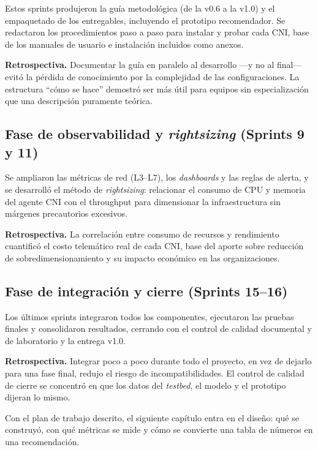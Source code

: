 Estos sprints produjeron la guía metodológica (de la v0.6 a la v1.0) y el empaquetado de los entregables, incluyendo el prototipo recomendador. Se redactaron los procedimientos paso a paso para instalar y probar cada CNI, base de los manuales de usuario e instalación incluidos como anexos.

\textbf{Retrospectiva.} Documentar la guía en paralelo al desarrollo ---y no al final--- evitó la pérdida de conocimiento por la complejidad de las configuraciones. La estructura ``cómo se hace'' demostró ser más útil para equipos sin especialización que una descripción puramente teórica.

\subsection{Fase de observabilidad y \emph{rightsizing} (Sprints 9 y 11)}

Se ampliaron las métricas de red (L3--L7), los \emph{dashboards} y las reglas de alerta, y se desarrolló el método de \emph{rightsizing}: relacionar el consumo de CPU y memoria del agente CNI con el throughput para dimensionar la infraestructura sin márgenes precautorios excesivos.

\textbf{Retrospectiva.} La correlación entre consumo de recursos y rendimiento cuantificó el costo telemático real de cada CNI, base del aporte sobre reducción de sobredimensionamiento y su impacto económico en las organizaciones.

\subsection{Fase de integración y cierre (Sprints 15--16)}

Los últimos sprints integraron todos los componentes, ejecutaron las pruebas finales y consolidaron resultados, cerrando con el control de calidad documental y de laboratorio y la entrega v1.0.

\textbf{Retrospectiva.} Integrar poco a poco durante todo el proyecto, en vez de dejarlo para una fase final, redujo el riesgo de incompatibilidades. El control de calidad de cierre se concentró en que los datos del \emph{testbed}, el modelo y el prototipo dijeran lo mismo.

Con el plan de trabajo descrito, el siguiente capítulo entra en el diseño: qué se construyó, con qué métricas se mide y cómo se convierte una tabla de números en una recomendación.
